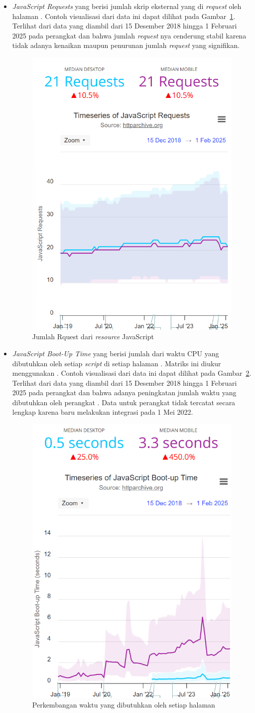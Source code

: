 \begin{itemize}
    \item \textit{JavaScript Requests} yang berisi jumlah skrip eksternal yang di \textit{request} oleh halaman \web. Contoh visualisasi dari data ini dapat dilihat pada Gambar~\ref{fig:jsreq}. Terlihat dari data yang diambil dari 15 Desember 2018 hingga 1 Februari 2025 pada perangkat \desktop dan \mobile bahwa jumlah \textit{request} nya cenderung stabil karena tidak adanya kenaikan maupun penurunan jumlah \textit{request} yang signifikan.
    \begin{figure}[H]
        \centering
        \includegraphics[width=0.4\linewidth]{Gambar/Contoh JavaScript Request}
        \caption{Jumlah Rquest dari \textit{resource} JavaScript}
        \label{fig:jsreq}
    \end{figure}

    
    \item \textit{JavaScript Boot-Up Time} yang berisi jumlah dari waktu CPU yang dibutuhkan oleh setiap \textit{script} di setiap halaman \web. Matriks ini diukur menggunakan \light. Contoh visualisasi dari data ini dapat dilihat pada Gambar~\ref{fig:jsbootup}. Terlihat dari data yang diambil dari 15 Desember 2018 hingga 1 Februari 2025 pada perangkat \desktop dan \mobile bahwa adanya peningkatan jumlah waktu yang dibutuhkan oleh perangkat \mobile. Data untuk perangkat \desktop tidak tercatat secara lengkap karena \light baru melakukan integrasi pada 1 Mei 2022.
    \begin{figure}[H]
        \centering
        \includegraphics[width=0.4\linewidth]{Gambar/Contoh JavaScript Bootup.png}
        \caption{Perkembangan waktu yang dibutuhkan oleh setiap halaman \web}
        \label{fig:jsbootup}
    \end{figure}
\end{itemize}

